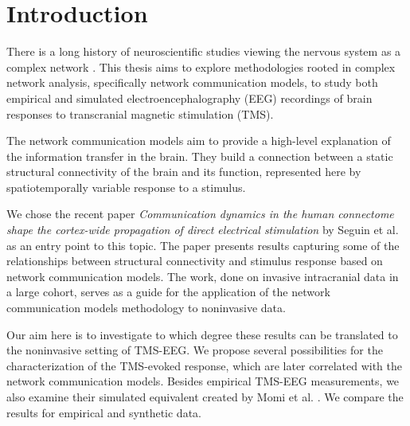 \chapter*{Introduction}

There is a long history of neuroscientific studies viewing the nervous system as a complex network \cite{sporns_structure_2013}. This thesis aims to explore methodologies rooted in complex network analysis, specifically network communication models, to study both empirical and simulated electroencephalography (EEG) recordings of brain responses to transcranial magnetic stimulation (TMS). 

The network communication models aim to provide a high-level explanation of the information transfer in the brain. They build a connection between a static structural connectivity of the brain and its function, represented here by spatiotemporally variable response to a stimulus. 

We chose the recent paper \textit{Communication dynamics in the human connectome shape the cortex-wide propagation of direct electrical stimulation} by Seguin et al. \cite{seguin_communication_2023} as an entry point to this topic. The paper presents results capturing some of the relationships between structural connectivity and stimulus response based on network communication models. The work, done on invasive intracranial data in a large cohort, serves as a guide for the application of the network communication models methodology to noninvasive data. 

Our aim here is to investigate to which degree these results can be translated to the noninvasive setting of TMS-EEG. We propose several possibilities for the characterization of the TMS-evoked response, which are later correlated with the network communication models. Besides empirical TMS-EEG measurements, we also examine their simulated equivalent created by Momi et al. \cite{momi_tms-evoked_2023}. We compare the results for empirical and synthetic data. 

